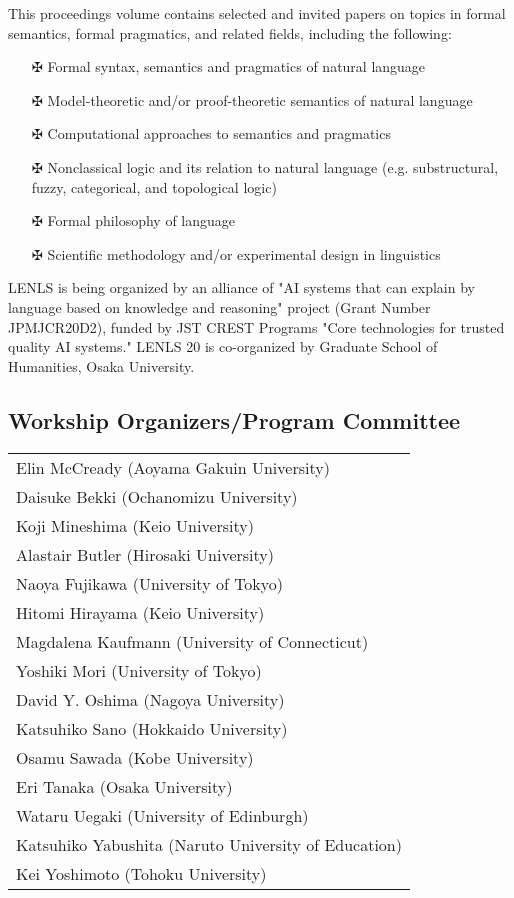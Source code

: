 \documentclass[12pt]{jarticle}
\begin{document}
This proceedings volume contains selected and invited papers on topics in formal semantics, formal pragmatics, and related fields, including the following:
\begin{itemize}
\item[$\maltese$] Formal syntax, semantics and pragmatics of natural language
\item[$\maltese$] Model-theoretic and/or proof-theoretic semantics of natural language
\item[$\maltese$] Computational approaches to semantics and pragmatics
\item[$\maltese$] Nonclassical logic and its relation to natural language 
  (e.g. substructural, fuzzy, categorical, and topological logic)
\item[$\maltese$] Formal philosophy of language
\item[$\maltese$] Scientific methodology and/or experimental design in linguistics
\end{itemize}


LENLS is being organized by an alliance of "AI systems that can explain by language based on knowledge and reasoning" project (Grant Number JPMJCR20D2), funded by JST CREST Programs "Core technologies for trusted quality AI systems."  LENLS 20 is co-organized by Graduate School of Humanities, Osaka University.


\subsection*{Workship Organizers/Program Committee}
\begin{flushleft}
\begin{tabular}{l}
Elin McCready (Aoyama Gakuin University) \\
Daisuke Bekki (Ochanomizu University) \\
Koji Mineshima (Keio University) \\
Alastair Butler (Hirosaki University) \\
Naoya Fujikawa (University of Tokyo) \\
Hitomi Hirayama (Keio University) \\
Magdalena Kaufmann (University of Connecticut) \\
Yoshiki Mori (University of Tokyo) \\
David Y. Oshima (Nagoya University) \\
Katsuhiko Sano (Hokkaido University) \\
Osamu Sawada (Kobe University) \\
Eri Tanaka (Osaka University) \\
Wataru Uegaki (University of Edinburgh) \\
Katsuhiko Yabushita (Naruto University of Education) \\
Kei Yoshimoto (Tohoku University) \\

\end{tabular}
\end{flushleft}
\newpage
  
  
\end{document}
